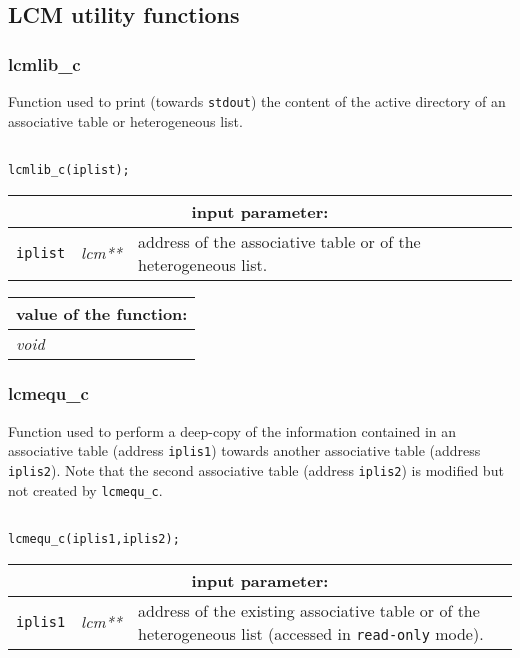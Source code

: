\vspace{0.4cm}

\subsection{LCM utility functions}

\subsubsection{lcmlib\_c}

Function used to print (towards {\tt stdout}) the content of the active directory of an associative table or heterogeneous list.

\begin{verbatim}

lcmlib_c(iplist);
\end{verbatim}

\noindent
\begin{tabular}{|p{1.5cm}|p{2cm}|p{11cm}|}
\hline
\multicolumn{3}{|c|}{\bf input parameter:} \\
\hline
{\tt iplist} & {\it lcm**} & address of the associative table or of the heterogeneous list. \\
\hline
\end{tabular}

\vskip 0.8cm

\noindent
\begin{tabular}{|p{4.0cm}|p{11cm}|}
\hline
\multicolumn{2}{|c|}{\bf value of the function:} \\
\hline
{\it void} &  \\
\hline
\end{tabular}

\subsubsection{lcmequ\_c}

Function used to perform a deep-copy of the information contained in an associative table (address {\tt iplis1}) 
towards another associative table (address {\tt iplis2}). Note that the second associative table (address {\tt iplis2}) is modified
but not created by {\tt lcmequ\_c}.

\begin{verbatim}

lcmequ_c(iplis1,iplis2);
\end{verbatim}

\noindent
\begin{tabular}{|p{1.5cm}|p{2cm}|p{11cm}|}
\hline
\multicolumn{3}{|c|}{\bf input parameter:} \\
\hline
{\tt iplis1} & {\it lcm**} & address of the existing associative table or of the heterogeneous list
                                    (accessed in {\tt read-only} mode). \\
\hline
\end{tabular}

